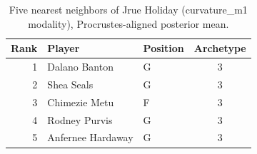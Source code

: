 \begin{table}[htbp]
  \centering\small
  \begin{tabular}{rllc}
    \toprule
    Rank & Player & Position & Archetype \\
    \midrule
    1 & Dalano Banton & G & 3 \\
    2 & Shea Seals & G & 3 \\
    3 & Chimezie Metu & F & 3 \\
    4 & Rodney Purvis & G & 3 \\
    5 & Anfernee Hardaway & G & 3 \\
    \bottomrule
  \end{tabular}
  \caption{Five nearest neighbors of Jrue Holiday (curvature_m1 modality), Procrustes-aligned posterior mean.}
  \label{tab:Jrue_Holiday_neighbors_curvature_m1}
\end{table}

